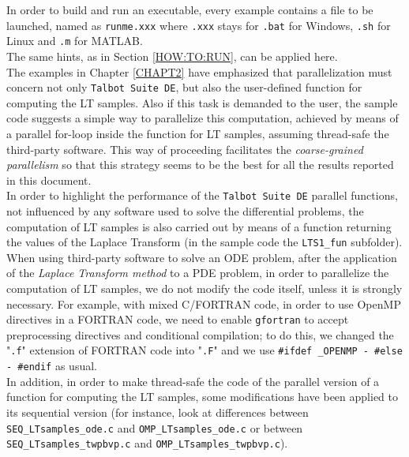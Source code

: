\documentclass[a4paper,10pt]{report}%
\begin{document}
In order to build and run an executable, every example contains a file to be launched, named as {\tt runme.xxx} where
{\tt .xxx} stays for {\tt .bat} for Windows, {\tt .sh} for Linux and {\tt .m} for MATLAB.
\\
The same hints, as in Section \ref{HOW:TO:RUN}, can be applied here.
\\[.15in]
The examples in Chapter \ref{CHAPT2} have emphasized that parallelization must concern not only {\tt Talbot Suite DE},
but also the user-defined function for computing the LT samples. Also if this task is demanded to the user, the
sample code suggests a simple way to parallelize this computation, achieved by means of a parallel for-loop
inside the function for LT samples, assuming thread-safe the third-party software. This way of proceeding
facilitates the {\em coarse-grained parallelism} so that this strategy seems to be the best for all the
results reported in this document.
\\
In order to highlight the performance of the {\tt Talbot Suite DE} parallel functions, not influenced by any software used to solve the differential problems, the computation of LT samples is also carried out by means of a function returning the values of the Laplace Transform (in the sample code the {\tt LTS1\_fun} subfolder).
\\
When using third-party software to solve an ODE problem, after the application of the {\em Laplace Transform method}
to a PDE problem, in order to parallelize the computation of LT samples, we do not modify the code itself,
unless it is strongly necessary.
For example, with mixed C/FORTRAN code, in order to use OpenMP directives in a FORTRAN code, we need to enable
{\tt gfortran} to accept preprocessing directives and conditional compilation; to do this, we changed the
"{\tt .f}" extension of FORTRAN code into "{\tt .F}" and we use {\tt \#ifdef \_OPENMP - \#else - \#endif} as
usual.
\\
In addition, in order to make thread-safe the code of the parallel version of a function for computing the LT samples,
some modifications have been applied to its sequential version (for instance, look at differences between
{\tt SEQ\_LTsamples\_ode.c} and {\tt OMP\_LTsamples\_ode.c} or between {\tt SEQ\_LTsamples\_twpbvp.c} and
{\tt OMP\_LTsamples\_twpbvp.c}).



\end{document}
